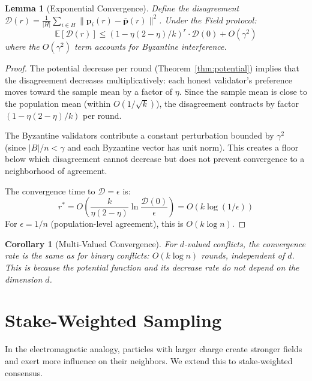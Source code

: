 \documentclass[11pt,a4paper]{article}
\newtheorem{lemma}[theorem]{Lemma}
\newtheorem{corollary}[theorem]{Corollary}
\begin{document}
\begin{lemma}[Exponential Convergence]
\label{lem:convergence-rate}
Define the disagreement $\mathcal{D}(r) = \frac{1}{|H|}\sum_{i \in H} \|\mathbf{p}_i(r) - \bar{\mathbf{p}}(r)\|^2$.
Under the Field protocol:
\[
\mathbb{E}[\mathcal{D}(r)] \leq (1 - \eta(2-\eta)/k)^r \cdot \mathcal{D}(0) + O(\gamma^2)
\]
where the $O(\gamma^2)$ term accounts for Byzantine interference.
\end{lemma}

\begin{proof}
The potential decrease per round (Theorem~\ref{thm:potential}) implies that the disagreement
decreases multiplicatively: each honest validator's preference moves toward the sample mean
by a factor of $\eta$. Since the sample mean is close to the population mean (within $O(1/\sqrt{k})$),
the disagreement contracts by factor $(1 - \eta(2-\eta)/k)$ per round.

The Byzantine validators contribute a constant perturbation bounded by $\gamma^2$ (since
$|B|/n < \gamma$ and each Byzantine vector has unit norm). This creates a floor below
which disagreement cannot decrease but does not prevent convergence to a neighborhood of
agreement.

The convergence time to $\mathcal{D} = \epsilon$ is:
\[
r^* = O\left(\frac{k}{\eta(2-\eta)} \ln \frac{\mathcal{D}(0)}{\epsilon}\right) = O(k \log(1/\epsilon))
\]
For $\epsilon = 1/n$ (population-level agreement), this is $O(k \log n)$.
\end{proof}

\begin{corollary}[Multi-Valued Convergence]
\label{cor:multi}
For $d$-valued conflicts, the convergence rate is the same as for binary conflicts:
$O(k \log n)$ rounds, independent of $d$. This is because the potential function and
its decrease rate do not depend on the dimension $d$.
\end{corollary}

\section{Stake-Weighted Sampling}
\label{sec:stake}

In the electromagnetic analogy, particles with larger charge create stronger fields
and exert more influence on their neighbors. We extend this to stake-weighted consensus.
\end{document}
